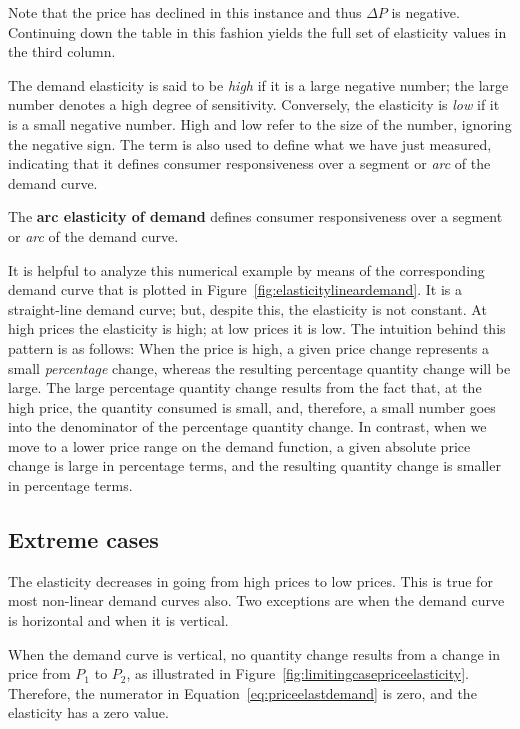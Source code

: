 Note that the price has declined in this instance and thus $\Delta P$ is negative. Continuing down the table in this fashion yields the full set of elasticity values in the third column. 

The demand elasticity is said to be \textit{high} if it is a large negative number; the large number denotes a high degree of sensitivity. Conversely, the elasticity is \textit{low} if it is a small negative number. High and low refer to the size of the number, ignoring the negative sign. The term  is also used to define what we have just measured, indicating that it defines consumer responsiveness over a segment or \textit{arc} of the demand curve.

\begin{DefBox}
The \textbf{arc elasticity of demand} defines consumer responsiveness over a segment or \textit{arc} of the demand curve.
\end{DefBox}

It is helpful to analyze this numerical example by means of the corresponding demand curve that is plotted in Figure~\ref{fig:elasticitylineardemand}. It is a straight-line demand curve; but, despite this, the elasticity is not constant. At high prices the elasticity is high; at low prices it is low. The intuition behind this pattern is as follows: When the price is high, a given price change represents a small \textit{percentage} change, whereas the resulting percentage quantity change will be large. The large percentage quantity change results from the fact that, at the high price, the quantity consumed is small, and, therefore, a small number goes into the denominator of the percentage quantity change. In contrast, when we move to a lower price range on the demand function, a given absolute price change is large in percentage terms, and the resulting quantity change is smaller in percentage terms. 

\subsection*{Extreme cases}

The elasticity decreases in going from high prices to low prices. This is true for most non-linear demand curves also. Two exceptions are when the demand curve is horizontal and when it is vertical. 

When the demand curve is vertical, no quantity change results from a change in price from $P_1$ to $P_2$, as illustrated in Figure~\ref{fig:limitingcasepriceelasticity}. Therefore, the numerator in Equation~\ref{eq:priceelastdemand} is zero, and the elasticity has a zero value.

